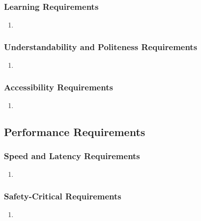 \documentclass[]{article}
\begin{document}
\subsubsection{Learning Requirements}
\label{ssub:learning_requirements}
\begin{enumerate}[{UH-L}1. ]
	\item 
\end{enumerate}

\subsubsection{Understandability and Politeness Requirements}
\label{ssub:understandability_and_politeness_requirements}
\begin{enumerate}[{UH-UP}1. ]
	\item 
\end{enumerate}

\subsubsection{Accessibility Requirements}
\label{ssub:accessibility_requirements}
\begin{enumerate}[{UH-A}1. ]
	\item 
\end{enumerate}


\subsection{Performance Requirements}
\label{sub:performance_requirements}

\subsubsection{Speed and Latency Requirements}
\label{ssub:speed_and_latency_requirements}
\begin{enumerate}[{PR-SL}1. ]
	\item 
\end{enumerate}

\subsubsection{Safety-Critical Requirements}
\label{ssub:safety_critical_requirements}
\begin{enumerate}[{PR-SC}1. ]
	\item 
\end{enumerate}
\end{document}
